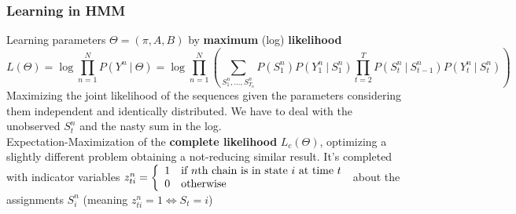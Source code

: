 \documentclass[10pt]{report}
\begin{document}
\subsubsection{Learning in HMM}
Learning parameters $\Theta=(\pi,A,B)$ by \textbf{maximum} (log) \textbf{likelihood}
$$L(\Theta) = \log\prod_{n=1}^N P(Y^n\:|\:\Theta) = \log\prod_{n=1}^N\left(\sum_{S_1^n,\ldots,S_{T_n}^n} P(S_1^n)P(Y_1^n\:|\:S_1^n)\prod_{t=2}^T P(S_t^n\:|\:S_{t-1}^n)P(Y_t^n\:|\:S_t^n)\right)$$
Maximizing the joint likelihood of the sequences given the parameters considering them independent and identically distributed. We have to deal with the unobserved $S_t^n$ and the nasty sum in the log.\\
Expectation-Maximization of the \textbf{complete likelihood} $L_c(\Theta)$, optimizing a slightly different problem obtaining a not-reducing similar result. It's completed with indicator variables $z_{ti}^n=\left\{\begin{array}{c l}
1&\text{if }n\text{th chain is in state }i\text{ at time }t\\
0&\text{otherwise}
\end{array}\right.$ about the assignments $S_i^n$ (meaning $z_{ti}^n = 1\Leftrightarrow S_t = i$)
\end{document}
